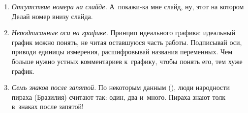 \documentclass[11pt]{article}
\begin{document}
\begin{enumerate}
\begin{enumerate}
		\item \textit{Отсутствие номера на слайде.} А~покажи-ка мне слайд, ну, этот\ldotst{} на котором\ldotst{} Делай номер внизу слайда.
		\item \textit{Неподписанные оси на графике.} Принцип идеального графика: идеальный график можно понять, не читая оставшуюся часть работы. Подписывай оси, приводи единицы измерения, расшифровывай названия переменных. Чем больше нужно устных комментариев к~графику, чтобы понять его, тем хуже график.
		\item \textit{Семь знаков после запятой.} По некоторым данным (\cite{piraha2008}), люди народности пираха (Бразилия) считают так: один, два и~много. Пираха знают толк в~знаках после запятой!
	\end{enumerate}
\end{enumerate}

\printbibliography
\end{document}
